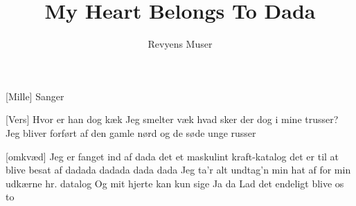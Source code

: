 \documentclass[a4paper,11pt]{article}
\title{My Heart Belongs To Dada}
\author{Revyens Muser}
\begin{document}
\maketitle

\begin{roles}
  [Mille] Sanger
\end{roles}

\begin{song}

[Vers] Hvor er han dog kæk
Jeg smelter væk  
hvad sker der dog i mine trusser?
Jeg bliver forført
af den gamle nørd
og de søde unge russer

[omkvæd] Jeg er fanget ind af dada
det et maskulint kraft-katalog
det er til at blive besat af
dadada dadada dada dada
Jeg ta'r alt undtag'n min hat af
for min udkærne hr. datalog
Og mit hjerte kan kun sige Ja da
Lad det endeligt blive os to


\end{song}
\end{document}
